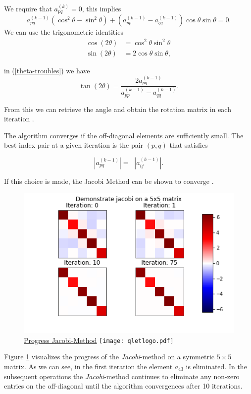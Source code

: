 \documentclass[12pt]{article}
\begin{document}
We require that $a_{pq}^{(k)} = 0$, this implies
\begin{equation}
\label{theta-troubles}
a^{(k-1)}_{pq} (\cos^2\theta - \sin^2\theta) + \left( a^{(k-1)}_{pp} - a^{(k-1)}_{qq} \right) \cos\theta \sin\theta = 0.
\end{equation}
We can use the trigonometric identities
\begin{align*}
\cos(2\theta) &= \cos^2 \theta \sin^2 \theta \\
\sin(2\theta) &= 2 \cos\theta \sin\theta,
\end{align*}

in (\ref{theta-troubles}) we have
$$\tan(2\theta) = \frac{2a^{(k-1)}_{pq}}{a^{(k-1)}_{pp} - a^{(k-1)}_{qq}}.$$

From this we can retrieve the angle and obtain the rotation matrix in each iteration \citep[p. 128]{NLA}.

The algorithm converges if the off-diagonal elements are sufficiently small. The best index pair at a given iteration is the pair $(p, q)$ that satisfies

\[
|a^{(k-1)}_{pq}| = \mathop{\max_{i<j}} |a^{(k-1)}_{ij}|.
\]

If this choice is made, the Jacobi Method can be shown to converge \citep[p. 128]{NLA}.

\begin{figure}[H]
\begin{center}
\caption{\href {https://github.com/thsis/NIS18/tree/master/media/plots}{Progress Jacobi-Method}  \protect\texttt{[image: qletlogo.pdf]}}
  \label{j-plot}
  \includegraphics[scale=0.6]{../media/plots/jacobi.png}
\end{center}
\end{figure}


Figure \ref{j-plot} visualizes the progress of the \textit{Jacobi}-method on a symmetric $5 \times 5$ matrix. As we can see, in the first iteration the element $a_{43}$ is eliminated. In the subsequent operations the \textit{Jacobi}-method continues to eliminate any non-zero entries on the off-diagonal until the algorithm convergences after 10 iterations.
\end{document}
